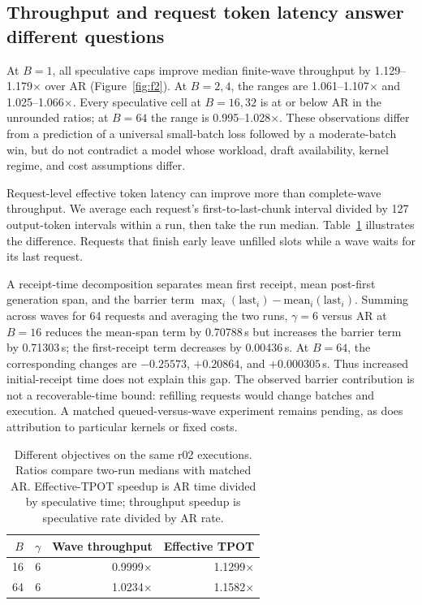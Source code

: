 \documentclass[10pt,twocolumn]{article}
\begin{document}
\subsection{Throughput and request token latency answer different questions}
At $B=1$, all speculative caps improve median finite-wave throughput by 1.129--1.179$\times$ over AR (Figure~\ref{fig:f2}). At $B=2,4$, the ranges are 1.061--1.107$\times$ and 1.025--1.066$\times$. Every speculative cell at $B=16,32$ is at or below AR in the unrounded ratios; at $B=64$ the range is 0.995--1.028$\times$. These observations differ from a prediction of a universal small-batch loss followed by a moderate-batch win, but do not contradict a model whose workload, draft availability, kernel regime, and cost assumptions differ.

Request-level effective token latency can improve more than complete-wave throughput. We average each request's first-to-last-chunk interval divided by 127 output-token intervals within a run, then take the run median. Table~\ref{tab:objectives} illustrates the difference. Requests that finish early leave unfilled slots while a wave waits for its last request.

A receipt-time decomposition separates mean first receipt, mean post-first generation span, and the barrier term $\max_i(\mathrm{last}_i)-\mathrm{mean}_i(\mathrm{last}_i)$. Summing across waves for 64 requests and averaging the two runs, $\gamma=6$ versus AR at $B=16$ reduces the mean-span term by 0.70788\,s but increases the barrier term by 0.71303\,s; the first-receipt term decreases by 0.00436\,s. At $B=64$, the corresponding changes are $-0.25573$, $+0.20864$, and $+0.000305$\,s. Thus increased initial-receipt time does not explain this gap. The observed barrier contribution is not a recoverable-time bound: refilling requests would change batches and execution. A matched queued-versus-wave experiment remains pending, as does attribution to particular kernels or fixed costs.

\begin{table}[t]
\centering\small
\caption{Different objectives on the same r02 executions. Ratios compare two-run medians with matched AR. Effective-TPOT speedup is AR time divided by speculative time; throughput speedup is speculative rate divided by AR rate.}
\label{tab:objectives}
\begin{tabular}{@{}rrrr@{}}
\toprule
$B$ & $\gamma$ & Wave throughput & Effective TPOT \\\midrule
16 & 6 & 0.9999$\times$ & 1.1299$\times$ \\
64 & 6 & 1.0234$\times$ & 1.1582$\times$ \\
\bottomrule
\end{tabular}
\end{table}
\end{document}
